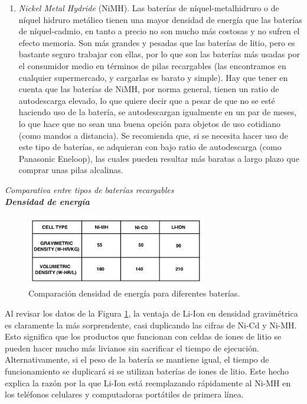 \documentclass[12pt]{article}
\begin{document}
\begin{enumerate}
		\item \textit{Nickel Metal Hydride} (NiMH). Las baterías de níquel-metalhidruro o de níquel hidruro metálico tienen una mayor densidad de energía que las baterías de níquel-cadmio, en tanto a precio no son mucho más costosas y no sufren el efecto memoria. Son más grandes y pesadas que las baterías de litio, pero es bastante seguro trabajar con ellas, por lo que son las baterías más usadas por el consumidor medio en términos de pilas recargables (las encontramos en cualquier supermercado, y cargarlas es barato y simple). Hay que tener en cuenta que las baterías de NiMH, por norma general, tienen un ratio de autodescarga elevado, lo que quiere decir que a pesar de que no se esté haciendo uso de la batería, se autodescargan igualmente en un par de meses, lo que hace que no sean una buena opción para objetos de uso cotidiano (como mandos a distancia). Se recomienda que, si se necesita hacer uso de este tipo de baterías, se adquieran con bajo ratio de autodescarga (como Panasonic Eneloop), las cuales pueden resultar más baratas a largo plazo que comprar unas pilas alcalinas.
		
	\end{enumerate}
	
	\noindent \textit{Comparativa entre tipos de baterías recargables} \\
	
	\noindent \textit{\textbf{Densidad de energía}}
	
		\begin{figure}[h]
		\begin{center}
			\includegraphics[width=0.7\textwidth]{img/energyDensityComparison_TxInst.png}
			\caption{Comparación densidad de energía para diferentes baterías.}
			\label{fig: comparación densidad energía}
		\end{center}
	\end{figure}
	
	\pagebreak 
	
	\noindent Al revisar los datos de la Figura \ref{fig: comparación densidad energía}, la ventaja de Li-Ion en densidad gravimétrica es claramente la más sorprendente, casi duplicando las cifras de Ni-Cd y Ni-MH. Esto significa que los productos que funcionan con celdas de iones de litio se pueden hacer mucho más livianos sin sacrificar el tiempo de ejecución. Alternativamente, si el peso de la batería se mantiene igual, el tiempo de funcionamiento se duplicará si se utilizan baterías de iones de litio. Este hecho explica la razón por la que Li-Ion está reemplazando rápidamente al Ni-MH en los teléfonos celulares y computadoras portátiles de primera línea. \\
	
\end{document}
